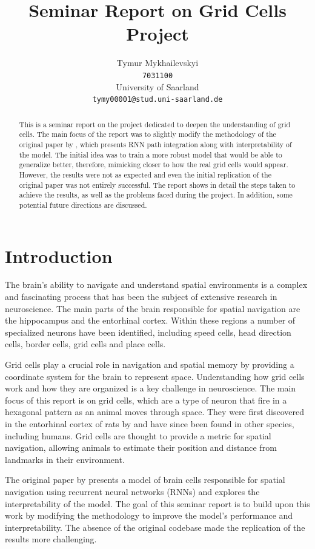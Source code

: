 \documentclass{article}
\title{Seminar Report on Grid Cells Project}
\author{Tymur Mykhailevskyi\\
  \texttt{7031100}\\
  University of Saarland\\
  \texttt{tymy00001@stud.uni-saarland.de}
  }
\begin{document}
\maketitle

\begin{abstract}
This is a seminar report on the project dedicated to deepen the understanding of grid cells. The main focus of the report was to slightly modify the methodology of the original paper by \cite{chaplot2018active}, which presents RNN path integration along with interpretability of the model. The initial idea was to train a more robust model that would be able to generalize better, therefore, mimicking closer to how the real grid cells would appear. However, the results were not as expected and even the initial replication of the original paper was not entirely successful. The report shows in detail the steps taken to achieve the results, as well as the problems faced during the project. In addition, some potential future directions are discussed.
\end{abstract}

\section{Introduction}

The brain's ability to navigate and understand spatial environments is a complex and fascinating process that has been the subject of extensive research in neuroscience. The main parts of the brain responsible for spatial navigation are the hippocampus and the entorhinal cortex. Within these regions a number of specialized neurons have been identified, including speed cells, head direction cells, border cells, grid cells and place cells. 

Grid cells play a crucial role in navigation and spatial memory by providing a coordinate system for the brain to represent space. Understanding how grid cells work and how they are organized is a key challenge in neuroscience. The main focus of this report is on grid cells, which are a type of neuron that fire in a hexagonal pattern as an animal moves through space. They were first discovered in the entorhinal cortex of rats by \cite{hafting2005microstructure} and have since been found in other species, including humans. Grid cells are thought to provide a metric for spatial navigation, allowing animals to estimate their position and distance from landmarks in their environment.

The original paper by \cite{chaplot2018active} presents a model of brain cells responsible for spatial navigation using recurrent neural networks (RNNs) and explores the interpretability of the model. The goal of this seminar report is to build upon this work by modifying the methodology to improve the model's performance and interpretability. The absence of the original codebase made the replication of the results more challenging.
\end{document}
